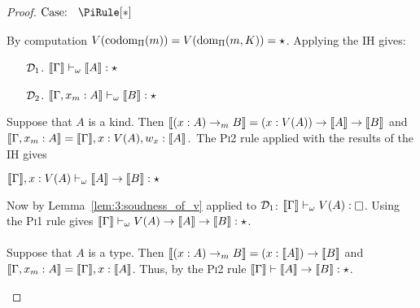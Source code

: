 \begin{proof}
    $\text{Case: }\begin{array}{c} \PiRule[*] \end{array}$
    \begin{proofcase}
        By computation $V(\textnormal{codom}_\Pi(m)) = V(\textnormal{dom}_\Pi(m, K)) = \star$.
        Applying the IH gives:
        \begin{enumerate}
            \item[$\mathcal{D}_{1}$.] $\llbracket \Gamma \rrbracket \vdash_\omega \llbracket A \rrbracket : \star$
            \item[$\mathcal{D}_{2}$.] $\llbracket \Gamma, x_m : A \rrbracket \vdash_\omega \llbracket B \rrbracket : \star$ 
        \end{enumerate}
        Suppose that $A$ is a kind.
        Then $\llbracket (x : A) \to_m B \rrbracket = (x : V(A)) \to \llbracket A \rrbracket \to \llbracket B \rrbracket$ and $\llbracket \Gamma, x_m : A \rrbracket = \llbracket \Gamma \rrbracket, x : V(A), w_x : \llbracket A \rrbracket$.\
        The \textsc{Pi2} rule applied with the results of the IH gives
            \begin{tightcenter} $\llbracket \Gamma \rrbracket, x : V(A) \vdash_\omega \llbracket A \rrbracket \to \llbracket B \rrbracket : \star$ \end{tightcenter}
        Now by Lemma~\ref{lem:3:soudness_of_v} applied to $\mathcal{D}_{1}$: $\sema{\Gamma} \vdash_\omega V(A) : \kind$.
        Using the \textsc{Pi1} rule gives $\llbracket \Gamma \rrbracket \vdash_\omega V(A) \to \llbracket A \rrbracket \to \llbracket B \rrbracket : \star$.
        \\ \\
        Suppose that $A$ is a type.
        Then $\llbracket (x : A) \to_m B \rrbracket = (x : \llbracket A \rrbracket) \to \llbracket B \rrbracket$ and $\llbracket \Gamma, x_m : A \rrbracket = \llbracket \Gamma \rrbracket, x : \llbracket A \rrbracket$.
        Thus, by the \textsc{Pi2} rule $\llbracket \Gamma \rrbracket \vdash \llbracket A \rrbracket \to \llbracket B \rrbracket : \star$.
    \end{proofcase}


\end{proof}
